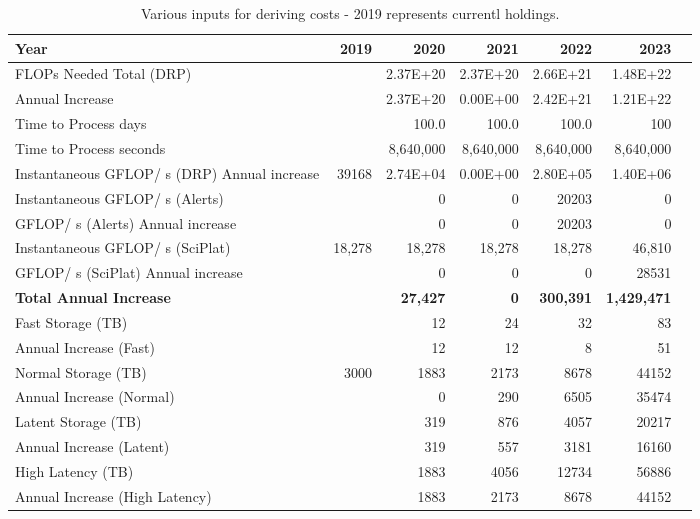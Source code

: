 \tiny \begin{longtable} { |p{}  |r  |r  |r  |r  |r  |r |} 
\caption{Various inputs for deriving costs - 2019 represents currentl holdings. \label{tab:Inputs}}\\ 
\hline 
\textbf{Year}&\textbf{2019}&\textbf{2020}&\textbf{2021}&\textbf{2022}&\textbf{2023} \\ \hline
{FLOPs Needed Total (DRP)}&{}&{2.37E+20}&{2.37E+20}&{2.66E+21}&{1.48E+22} \\ \hline
{Annual Increase}&{}&{2.37E+20}&{0.00E+00}&{2.42E+21}&{1.21E+22} \\ \hline
{Time to Process days}&{}&{100.0}&{100.0}&{100.0}&{100} \\ \hline
{Time to Process seconds}&{}&{8,640,000}&{8,640,000}&{8,640,000}&{8,640,000} \\ \hline
{Instantaneous GFLOP/ s (DRP) Annual increase}&{39168}&{2.74E+04}&{0.00E+00}&{2.80E+05}&{1.40E+06} \\ \hline
{Instantaneous GFLOP/ s (Alerts)}&{}&{0}&{0}&{20203}&{0} \\ \hline
{GFLOP/ s (Alerts) Annual increase}&{}&{0}&{0}&{20203}&{0} \\ \hline
{Instantaneous GFLOP/ s (SciPlat)}&{18,278}&{18,278}&{18,278}&{18,278}&{46,810} \\ \hline
{GFLOP/ s (SciPlat) Annual increase}&{}&{0}&{0}&{0}&{28531} \\ \hline
\textbf{Total Annual Increase}&\textbf{}&\textbf{27,427}&\textbf{0}&\textbf{300,391}&\textbf{1,429,471} \\ \hline
{Fast Storage (TB)}&{}&{12}&{24}&{32}&{83} \\ \hline
{Annual Increase (Fast)}&{}&{12}&{12}&{8}&{51} \\ \hline
{Normal Storage (TB)}&{3000}&{1883}&{2173}&{8678}&{44152} \\ \hline
{Annual Increase (Normal)}&{}&{0}&{290}&{6505}&{35474} \\ \hline
{Latent Storage  (TB)}&{}&{319}&{876}&{4057}&{20217} \\ \hline
{Annual Increase (Latent)}&{}&{319}&{557}&{3181}&{16160} \\ \hline
{High Latency (TB)}&{}&{1883}&{4056}&{12734}&{56886} \\ \hline
{Annual Increase (High Latency)}&{}&{1883}&{2173}&{8678}&{44152} \\ \hline
\end{longtable} \normalsize
